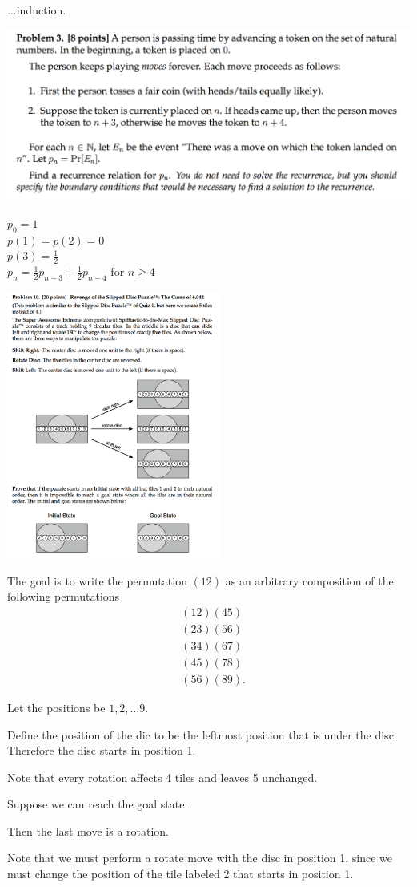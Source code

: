 \documentclass[12pt]{article}
\begin{document}
...induction.

\newpage
\begin{mdframed}
\includegraphics[width=400pt]{img/MIT-math-for-cs-2006-3.png}
\end{mdframed}
$p_0 = 1$\\
$p(1) = p(2) = 0$\\
$p(3) = \frac{1}{2}$\\
$p_n = \frac{1}{2}p_{n-3} + \frac{1}{2}p_{n-4}$ for $n \geq 4$\\

\newpage
\begin{mdframed}
\includegraphics[width=200pt]{img/MIT-math-for-cs-2008-10.png}
\end{mdframed}

The goal is to write the permutation $(12)$ as an arbitrary composition of the following
permutations
\begin{align*}
  &(12)(45)\\
  &(23)(56)\\
  &(34)(67)\\
  &(45)(78)\\
  &(56)(89).
\end{align*}


Let the positions be $1, 2, \ldots 9$.

Define the position of the dic to be the leftmost position that is under the disc. Therefore the
disc starts in position 1.

Note that every rotation affects 4 tiles and leaves 5 unchanged.

Suppose we can reach the goal state.

Then the last move is a rotation.

Note that we must perform a rotate move with the disc in position 1, since we must change the
position of the tile labeled 2 that starts in position 1.
\end{document}
